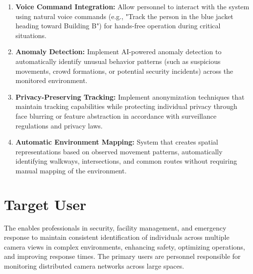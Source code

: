 \begin{enumerate}[leftmargin=80pt]
    \item \textbf{Voice Command Integration:} Allow personnel to interact with the system using natural voice commands (e.g., "Track the person in the blue jacket heading toward Building B") for hands-free operation during critical situations.

    \item \textbf{Anomaly Detection:} Implement AI-powered anomaly detection to automatically identify unusual behavior patterns (such as suspicious movements, crowd formations, or potential security incidents) across the monitored environment.

    \item \textbf{Privacy-Preserving Tracking:} Implement anonymization techniques that maintain tracking capabilities while protecting individual privacy through face blurring or feature abstraction in accordance with surveillance regulations and privacy laws.

    \item \textbf{Automatic Environment Mapping:} System that creates spatial representations based on observed movement patterns, automatically identifying walkways, intersections, and common routes without requiring manual mapping of the environment.
\end{enumerate}

\section{Target User}
\label{section:target-user}

The \usevar{\srsTitle} enables professionals in security, facility management, and emergency response to maintain consistent identification of individuals across multiple camera views in complex environments, enhancing safety, optimizing operations, and improving response times.
The primary users are personnel responsible for monitoring distributed camera networks across large spaces.

